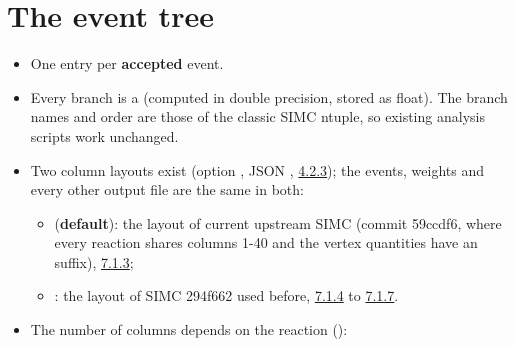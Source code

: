 \section{\texorpdfstring{The event tree }{The event tree h10}}\label{user_manual-07u5foutputs:71-the-event-tree-h10}
\begin{itemize}
\item One entry per \textbf{accepted} event.
\item Every branch is a  (computed in double precision, stored as float). The branch names and order are those of
the classic SIMC ntuple, so existing analysis scripts work unchanged.
\item Two column layouts exist (option , JSON ,
\hyperref[user_manual-04u5finputs:423-output]{4.2.3}); the events, weights and every other output file are the same in both:

\begin{itemize}
\item {} (\textbf{default}): the layout of current upstream SIMC (commit 59ccdf6, where every reaction shares columns
1-40 and the vertex quantities have an  suffix), \hyperref[user_manual-07u5foutputs:713-upstream-layout-default]{7.1.3};
\item {}: the layout of SIMC 294f662 used before, \hyperref[user_manual-07u5foutputs:714-legacy-eep-layout-46-columns]{7.1.4} to
\hyperref[user_manual-07u5foutputs:717-legacy-rho-layout-59-columns]{7.1.7}.
\end{itemize}
\item The number of columns depends on the reaction ():
\end{itemize}
